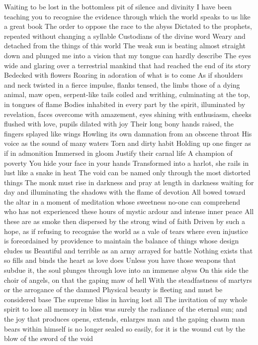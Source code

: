 \documentclass{article}
\begin{document}
\iffalse
Waiting to be lost in the bottomless pit of silence and divinity
I have been teaching you to recognise the evidence through which the world speaks to us like a great book
The order to oppose the race to the abyss
Dictated to the prophets, repeated without changing a syllable
Custodians of the divine word
Weary and detached from the things of this world
The weak sun is beating almost straight down and plunged me into a vision that my tongue can hardly describe
The eyes wide and glaring over a terrestrial mankind that had reached the end of its story
Bedecked with flowers
Roaring in adoration of what is to come
As if shoulders and neck twisted in a fierce impulse, flanks tensed, the limbs those of a dying animal, maw open, serpent-like tails coiled and writhing, culminating at the top, in tongues of flame
Bodies inhabited in every part by the spirit, illuminated by revelation, faces overcome with amazement, eyes shining with enthusiasm, cheeks flushed with love, pupils dilated with joy
Their long bony hands raised, the fingers splayed like wings
Howling its own damnation from an obscene throat
His voice as the sound of many waters
Torn and dirty habit
Holding up one finger as if in admonition
Immersed in gloom
Justify their carnal life
A champion of poverty
You hide your face in your hands
Transformed into a harlot, she rails in lust like a snake in heat
The void can be named only through the most distorted things
The monk must rise in darkness and pray at length in darkness waiting for day and illuminating the shadows with the flame of devotion
All bowed toward the altar in a moment of meditation whose sweetness no-one can comprehend who has not experienced these hours of mystic ardour and intense inner peace
All these are as smoke then dispersed by the strong wind of faith
Driven by such a hope, as if refusing to recognise the world as a vale of tears where even injustice is foreordained by providence to maintain the balance of things whose design eludes us
Beautiful and terrible as an army arrayed for battle
Nothing exists that so fills and binds the heart as love does
Unless you have those weapons that subdue it, the soul plunges through love into an immense abyss
On this side the choir of angels, on that the gaping maw of hell
With the steadfastness of martyrs or the arrogance of the damned
Physical beauty is fleeting and must be considered base
The supreme bliss in having lost all
The invitation of my whole spirit to lose all memory in bliss was surely the radiance of the eternal sun; and the joy that produces opens, extends, enlarges man and the gaping chasm man bears within himself is no longer sealed so easily, for it is the wound cut by the blow of the sword of the void
\end{document}
